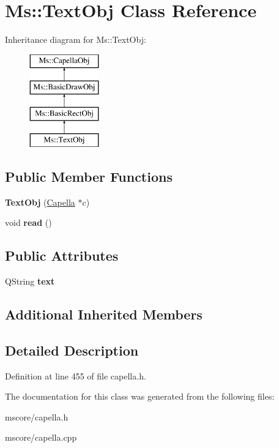 \hypertarget{class_ms_1_1_text_obj}{}\section{Ms\+:\+:Text\+Obj Class Reference}
\label{class_ms_1_1_text_obj}
Inheritance diagram for Ms\+:\+:Text\+Obj\+:\begin{figure}[H]
\begin{center}
\leavevmode
\includegraphics[height=4.000000cm]{class_ms_1_1_text_obj}
\end{center}
\end{figure}
\subsection*{Public Member Functions}
\begin{DoxyCompactItemize}
\item 
\mbox{\label{class_ms_1_1_text_obj_a1bf4093f59da4fa34fead139aa29fc65}} 
{\bfseries Text\+Obj} (\hyperlink{class_ms_1_1_capella}{Capella} $\ast$c)
\item 
\mbox{\label{class_ms_1_1_text_obj_abb685bd2109bbfd1d244818d1a2e5924}} 
void {\bfseries read} ()
\end{DoxyCompactItemize}
\subsection*{Public Attributes}
\begin{DoxyCompactItemize}
\item 
\mbox{\label{class_ms_1_1_text_obj_a81d8bda16ebdbc2fde5bd56dd9150ce5}} 
Q\+String {\bfseries text}
\end{DoxyCompactItemize}
\subsection*{Additional Inherited Members}


\subsection{Detailed Description}


Definition at line 455 of file capella.\+h.



The documentation for this class was generated from the following files\+:\begin{DoxyCompactItemize}
\item 
mscore/capella.\+h\item 
mscore/capella.\+cpp\end{DoxyCompactItemize}
